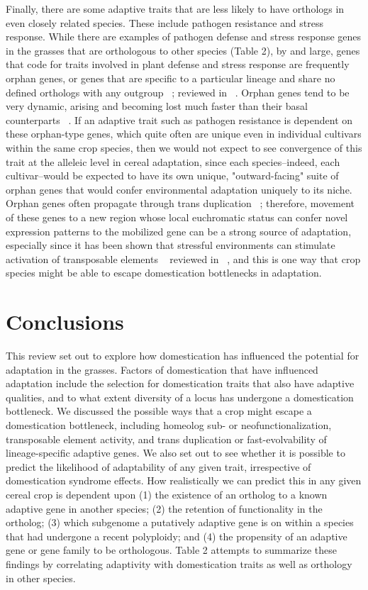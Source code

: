 \documentclass[12pt]{article}
\begin{document}
Finally, there are some adaptive traits that are less likely to have orthologs in even closely related species. These include pathogen resistance and stress response. While there are examples of pathogen defense and stress response genes in the grasses that are orthologous to other species (Table 2), by and large, genes that code for traits involved in plant defense and stress response are frequently orphan genes, or genes that are specific to a particular lineage and share no defined orthologs with any outgroup ~\cite{Woodhouse2011}; reviewed in ~\cite{Arendsee2014}. Orphan genes tend to be very dynamic, arising and becoming lost much faster than their basal counterparts ~\cite{Freeling2008}.  If an adaptive trait such as pathogen resistance is dependent on these orphan-type genes, which quite often are unique even in individual cultivars within the same crop species, then we would not expect to see convergence of this trait at the alleleic level in cereal adaptation, since each species--indeed, each cultivar--would be expected to have its own unique, "outward-facing" suite of orphan genes that would confer environmental adaptation uniquely to its niche. Orphan genes often propagate through trans duplication ~\cite{Freeling2008, Arendsee2014}; therefore, movement of these genes to a new region whose local euchromatic status can confer novel expression patterns to the mobilized gene can be a strong source of adaptation, especially since it has been shown that stressful environments can stimulate activation of transposable elements ~\cite{Beguiristain2001, Makarevitch2015}  reviewed in ~\cite{Negi2016}, and this is one way that crop species might be able to escape domestication bottlenecks in adaptation.

\section*{Conclusions}
This review set out to explore how domestication has influenced the potential for adaptation in the grasses.  Factors of domestication that have influenced adaptation include the selection for domestication traits that also have adaptive qualities, and to what extent diversity of a locus has undergone a domestication bottleneck. We discussed the possible ways that a crop might escape a domestication bottleneck, including homeolog sub- or neofunctionalization, transposable element activity, and trans duplication or fast-evolvability of lineage-specific adaptive genes. We also set out to see whether it is possible to predict the likelihood of adaptability of any given trait, irrespective of domestication syndrome effects. How realistically we can predict this in any given cereal crop is dependent upon  (1) the existence of an ortholog to a known adaptive gene in another species; (2) the retention of functionality in the ortholog; (3)  which subgenome a putatively adaptive gene is on within a species that had undergone a recent polyploidy; and (4) the propensity of an adaptive gene or gene family to be orthologous.   Table 2 attempts to summarize these findings by correlating adaptivity with domestication traits as well as orthology in other species.  




\end{document}
